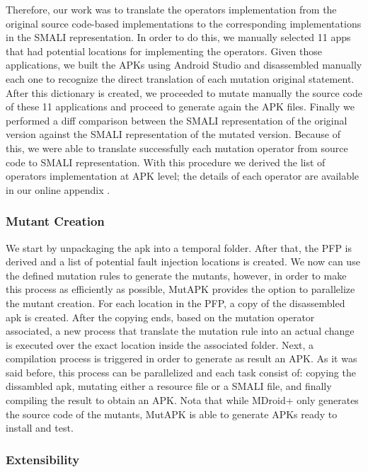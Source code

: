  
Therefore, our work was to translate the  operators implementation from the original source code-based implementations to the corresponding implementations in the SMALI representation. In order to do this, we manually selected 11 apps that had potential locations for implementing the operators. Given those applications, we built the APKs using Android Studio and disassembled manually each one to recognize the direct translation of each mutation original statement. After this dictionary is created, we proceeded to mutate manually the source code of these 11 applications and proceed to generate again the APK files. Finally we performed a diff comparison between the SMALI representation of the original version against the SMALI representation of the mutated version. Because of this, we were able to translate successfully each mutation operator from source code to SMALI representation. With this procedure we derived the list of operators implementation at APK level; the details of each operator are available in our online appendix \cite{MutAPK}.

\subsubsection{Mutant Creation}

We start by unpackaging the apk into a temporal folder. After that, the PFP is derived and a list of potential fault injection locations is created. We now can use the defined mutation rules to generate the mutants, however, in order to make this process as efficiently as possible, MutAPK provides the option to parallelize the mutant creation. For each location in the PFP, a copy of the disassembled apk is created. After the copying ends, based on the mutation operator associated, a new process that translate the mutation rule into an actual change is executed over the exact location inside the associated folder. Next, a compilation process is triggered in order to generate as result an APK. As it was said before, this process can be parallelized and each task consist of: copying the dissambled apk, mutating either a resource file or a SMALI file, and finally compiling the result to obtain an APK.  Nota that while MDroid+ only generates the source code of the mutants, MutAPK is able to generate APKs ready to install and test.

\subsubsection{Extensibility}

